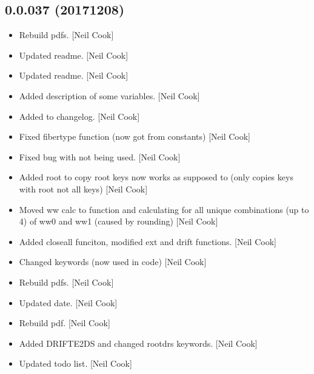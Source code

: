 \documentclass[a4paper,10pt,english]{report}
\begin{document}
\subsection{0.0.037 (2017\sphinxhyphen{}12\sphinxhyphen{}08)}
\label{\detokenize{misc/changelog:id534}}\begin{itemize}
\item {} 
Rebuild pdfs. {[}Neil Cook{]}

\item {} 
Updated readme. {[}Neil Cook{]}

\item {} 
Updated readme. {[}Neil Cook{]}

\item {} 
Added description of some variables. {[}Neil Cook{]}

\item {} 
Added to changelog. {[}Neil Cook{]}

\item {} 
Fixed fibertype function (now got from constants) {[}Neil Cook{]}

\item {} 
Fixed bug with  not being used. {[}Neil Cook{]}

\item {} 
Added root to copy root keys \sphinxhyphen{} now works as supposed to (only copies
keys with root not all keys) {[}Neil Cook{]}

\item {} 
Moved ww calc to function and calculating for all unique combinations
(up to 4) of ww0 and ww1 (caused by rounding) {[}Neil Cook{]}

\item {} 
Added closeall funciton, modified ext and drift functions. {[}Neil Cook{]}

\item {} 
Changed  keywords (now used in code) {[}Neil Cook{]}

\item {} 
Rebuild pdfs. {[}Neil Cook{]}

\item {} 
Updated date. {[}Neil Cook{]}

\item {} 
Rebuild pdf. {[}Neil Cook{]}

\item {} 
Added DRIFT\sphinxhyphen{}E2DS and changed rootdrs keywords. {[}Neil Cook{]}

\item {} 
Updated todo list. {[}Neil Cook{]}


\end{itemize}
\end{document}
